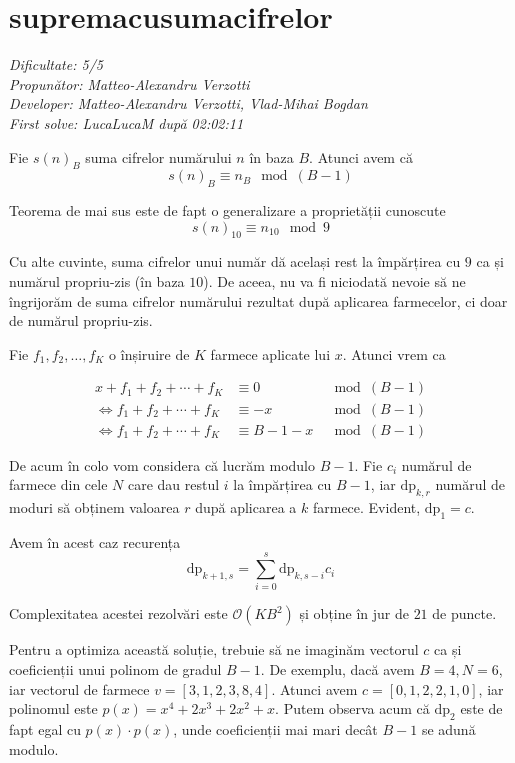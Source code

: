 \section{supremacusumacifrelor}
\textit{Dificultate: 5/5} \\
\textit{Propunător: Matteo-Alexandru Verzotti} \\
\textit{Developer: Matteo-Alexandru Verzotti, Vlad-Mihai Bogdan} \\
\textit{First solve: LucaLucaM după 02:02:11}  \\

\begin{theorem}
	Fie $s(n)_B$ suma cifrelor numărului $n$ în baza $B$. Atunci avem că
	\[
	    s(n)_B \equiv n_B \mod (B - 1)
	\]
\end{theorem}

Teorema de mai sus este de fapt o generalizare a proprietății cunoscute
\[
    s(n)_{10} \equiv n_{10} \mod 9
\]

Cu alte cuvinte, suma cifrelor unui număr dă același rest la împărțirea cu $9$ ca și numărul propriu-zis (în baza $10$). De aceea, nu va fi niciodată nevoie să ne îngrijorăm de suma cifrelor numărului rezultat după aplicarea farmecelor, ci doar de numărul propriu-zis.

Fie $f_1, f_2, \dots, f_K$ o înșiruire de $K$ farmece aplicate lui $x$. Atunci vrem ca 

\begin{align}
    x + f_1 + f_2 + \cdots + f_K & \equiv 0 & \mod (B - 1) \\
    \Longleftrightarrow f_1 + f_2 + \cdots + f_K & \equiv -x & \mod (B - 1) \\
    \Longleftrightarrow f_1 + f_2 + \cdots + f_K & \equiv B - 1 - x & \mod (B - 1)
\end{align}


De acum în colo vom considera că lucrăm modulo $B - 1$. Fie $c_i$ numărul de farmece din cele $N$ care dau restul $i$ la împărțirea cu $B - 1$, iar $\mathrm{dp}_{k, r}$ numărul de moduri să obținem valoarea $r$ după aplicarea a $k$ farmece. Evident, $\mathrm{dp}_1 = c$.

Avem în acest caz recurența 
\[
    \mathrm{dp}_{k+1,s}
    = \sum_{i=0}^{s} \mathrm{dp}_{k,s-i} c_i
\]

Complexitatea acestei rezolvări este $\mathcal{O}(KB^2)$ și obține în jur de $21$ de puncte.

\medskip

Pentru a optimiza această soluție, trebuie să ne imaginăm vectorul $c$ ca și coeficienții unui polinom de gradul $B - 1$. De exemplu, dacă avem $B = 4, N = 6$, iar vectorul de farmece $v = [3, 1, 2, 3, 8, 4]$. Atunci avem $c = [0, 1, 2, 2, 1, 0]$, iar polinomul este $p(x) = x^4 + 2x^3 + 2x^2 + x$. Putem observa acum că $\mathrm{dp}_2$ este de fapt egal cu $p(x) \cdot p(x)$, unde coeficienții mai mari decât $B - 1$ se adună modulo.

